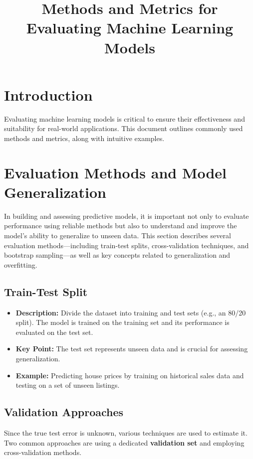 \documentclass[11pt]{article}
\title{Methods and Metrics for Evaluating Machine Learning Models}
\author{}
\date{}
\begin{document}
\maketitle

\section{Introduction}
Evaluating machine learning models is critical to ensure their effectiveness and suitability for real-world applications. This document outlines commonly used methods and metrics, along with intuitive examples.
\section{Evaluation Methods and Model Generalization}

In building and assessing predictive models, it is important not only to evaluate performance using reliable methods but also to understand and improve the model’s ability to generalize to unseen data. This section describes several evaluation methods—including train-test splits, cross-validation techniques, and bootstrap sampling—as well as key concepts related to generalization and overfitting.

\subsection{Train-Test Split}
\begin{itemize}
    \item \textbf{Description:} Divide the dataset into training and test sets (e.g., an 80/20 split). The model is trained on the training set and its performance is evaluated on the test set.
    \item \textbf{Key Point:} The test set represents unseen data and is crucial for assessing generalization.
    \item \textbf{Example:} Predicting house prices by training on historical sales data and testing on a set of unseen listings.
\end{itemize}

\subsection{Validation Approaches}
Since the true test error is unknown, various techniques are used to estimate it. Two common approaches are using a dedicated \textbf{validation set} and employing cross-validation methods.
\end{document}
